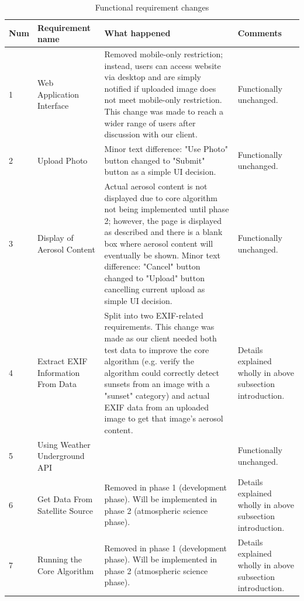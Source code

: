 \documentclass[onecolumn, draftclsnofoot,10pt, compsoc]{IEEEtran}
\begin{document}
\begin{flushleft}
\begin{table}[H]
\caption{Functional requirement changes}\label{table:1}
\centering
\begin{tabular}{| p{1cm} | p{5cm} | p{5cm} | p{4cm} |}
\hline
\textbf{Num} & \textbf{Requirement name} & \textbf{What happened} & \textbf{Comments}\\
\hline
1 & Web Application Interface & Removed mobile-only restriction; instead, users can access website via desktop and are simply notified if uploaded image does not meet mobile-only restriction. This change was made to reach a wider range of users after discussion with our client. & Functionally unchanged. \\
\hline
2 & Upload Photo & Minor text difference: "Use Photo" button changed to "Submit" button as a simple UI decision. & Functionally unchanged. \\
\hline
3 & Display of Aerosol Content & Actual aerosol content is not displayed due to core algorithm not being implemented until phase 2; however, the page is displayed as described and there is a blank box where aerosol content will eventually be shown. Minor text difference: "Cancel" button changed to "Upload" button cancelling current upload as simple UI decision. & Functionally unchanged. \\
\hline
4 & Extract EXIF Information From Data & Split into two EXIF-related requirements. This change was made as our client needed both test data to improve the core algorithm (e.g. verify the algorithm could correctly detect sunsets from an image with a "sunset" category) and actual EXIF data from an uploaded image to get that image's aerosol content. & Details explained wholly in above subsection introduction. \\
\hline
5 & Using Weather Underground API & & Functionally unchanged. \\
\hline
6 & Get Data From Satellite Source & Removed in phase 1 (development phase). Will be implemented in phase 2 (atmospheric science phase). & Details explained wholly in above subsection introduction. \\
\hline
7 & Running the Core Algorithm &  Removed in phase 1 (development phase). Will be implemented in phase 2 (atmospheric science phase). & Details explained wholly in above subsection introduction. \\
\hline
\end{tabular}
\end{table}
 

\end{flushleft}
\end{document}
